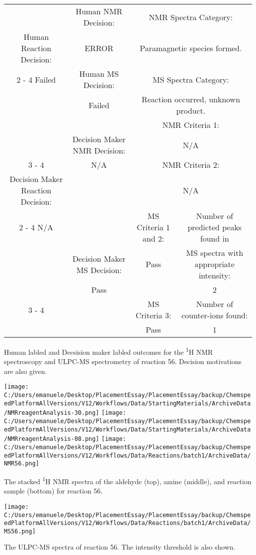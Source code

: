 \documentclass{article}%
\begin{document}
\begin{Decision Table}[H]%
\begin{tabular}{|c|c|c|c|}%
\hline%
&Human NMR Decision:&\multicolumn{2}{|c|}{NMR Spectra Category:}\\%
Human Reaction Decision:&ERROR&\multicolumn{2}{|c|}{Paramagnetic species formed.}\\%
\cline{2%
-%
4}%
Failed&Human MS Decision:&\multicolumn{2}{|c|}{MS Spectra Category:}\\%
&Failed&\multicolumn{2}{|c|}{Reaction occurred, unknown product.}\\%
\hline%
&&\multicolumn{2}{|c|}{NMR Criteria 1:}\\%
&Decision Maker NMR Decision:&\multicolumn{2}{|c|}{N/A}\\%
\cline{3%
-%
4}%
&N/A&\multicolumn{2}{|c|}{NMR Criteria 2:}\\%
Decision Maker Reaction Decision:&&\multicolumn{2}{|c|}{N/A}\\%
\cline{2%
-%
4}%
N/A&&MS Criteria 1 and 2:&Number of predicted peaks found in\\%
&Decision Maker MS Decision:&Pass&MS spectra with appropriate intensity:\\%
&Pass&&2\\%
\cline{3%
-%
4}%
&&MS Criteria 3:&Number of counter{-}ions found:\\%
&&Pass&1\\%
\hline%
\end{tabular}%
\caption{Human labled and Decsision maker labled outcomes for the \textsuperscript{1}H NMR spectroscopy and ULPC-MS spectrometry of reaction 56. Decision motivations are also given.}%
\end{Decision Table}%
\begin{NMR Spectra}[H]%
\begin{center}%
\texttt{[image: C:/Users/emanuele/Desktop/PlacementEssay/PlacementEssay/backup/ChemspeedPlatformAllVersions/V12/Workflows/Data/StartingMaterials/ArchiveData/NMRreagentAnalysis-30.png]}\hfill%
\texttt{[image: C:/Users/emanuele/Desktop/PlacementEssay/PlacementEssay/backup/ChemspeedPlatformAllVersions/V12/Workflows/Data/StartingMaterials/ArchiveData/NMRreagentAnalysis-08.png]}\hfill%
\texttt{[image: C:/Users/emanuele/Desktop/PlacementEssay/PlacementEssay/backup/ChemspeedPlatformAllVersions/V12/Workflows/Data/Reactions/batch1/ArchiveData/NMR56.png]}\hfill%
\end{center}%
\caption{The stacked \textsuperscript{1}H NMR spectra of the aldehyde (top), amine (middle), and reaction sample (bottom) for reaction 56.}%
\end{NMR Spectra}%
\begin{MS Spectra}[H]%
\begin{center}%
\texttt{[image: C:/Users/emanuele/Desktop/PlacementEssay/PlacementEssay/backup/ChemspeedPlatformAllVersions/V12/Workflows/Data/Reactions/batch1/ArchiveData/MS56.png]}\hfill%
\end{center}%
\caption{The ULPC-MS spectra of reaction 56. The intensity threshold is also shown.}%
\end{MS Spectra}%
\end{document}
